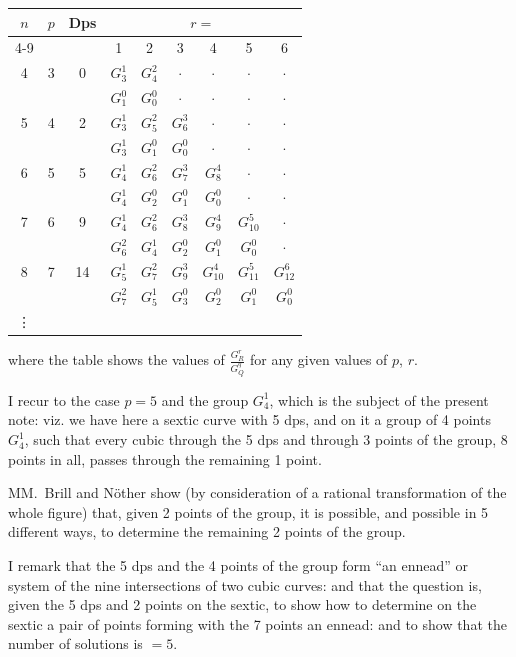 \documentclass[11pt,a4paper]{book}
\begin{document}
\begin{center}
\begin{tabular}{|c|c|c|cccccc|}
\hline
$n$ & $p$ & Dps & \multicolumn{6}{c|}{$r = $}\\
\cline{4-9}
& & & 1 & 2 & 3 & 4 & 5 & 6\\
\hline
4 & 3 & 0 & $G_3^1$ & $G_4^2$ & $\cdot$ & $\cdot$ & $\cdot$ & $\cdot$\\
& & & $G_1^0$ & $G_0^0$ & $\cdot$ & $\cdot$ & $\cdot$ & $\cdot$\\
\hline
5 & 4 & 2 & $G_3^1$ & $G_5^2$ & $G_6^3$ & $\cdot$ & $\cdot$ & $\cdot$\\
& & & $G_3^1$ & $G_1^0$ & $G_0^0$ & $\cdot$ & $\cdot$ & $\cdot$\\
\hline
6 & 5 & 5 & $G_4^1$ & $G_6^2$ & $G_7^3$ & $G_8^4$ & $\cdot$ & $\cdot$\\
& & & $G_4^1$ & $G_2^0$ & $G_1^0$ & $G_0^0$ & $\cdot$ & $\cdot$\\
\hline
7 & 6 & 9 & $G_4^1$ & $G_6^2$ & $G_8^3$ & $G_9^4$ & $G_{10}^5$ & $\cdot$\\
& & & $G_6^2$ & $G_4^1$ & $G_2^0$ & $G_1^0$ & $G_0^0$ & $\cdot$\\
\hline
8 & 7 & 14 & $G_5^1$ & $G_7^2$ & $G_9^3$ & $G_{10}^4$ & $G_{11}^5$ & $G_{12}^6$\\
& & & $G_7^2$ & $G_5^1$ & $G_3^0$ & $G_2^0$ & $G_1^0$ & $G_0^0$\\
\hline
\vdots & & & & & & & &\\
\hline
\end{tabular}
\end{center}

where the table shows the values of $\displaystyle\frac{G_R^r}{G_Q^q}$ for any given values of $p$, $r$.

I recur to the case $p = 5$ and the group $G_4^1$, which is the subject of the present note: viz. we have here a sextic curve with 5 dps, and on it a group of 4 points $G_4^1$, such that every cubic through the 5 dps and through 3 points of the group, 8 points in all, passes through the remaining 1 point.

MM.~Brill and N\"{o}ther show (by consideration of a rational transformation of the whole figure) that, given 2 points of the group, it is possible, and possible in 5 different ways, to determine the remaining 2 points of the group.

I remark that the 5 dps and the 4 points of the group form ``an ennead'' or system of the nine intersections of two cubic curves: and that the question is, given the 5 dps and 2 points on the sextic, to show how to determine on the sextic a pair of points forming with the 7 points an ennead: and to show that the number of solutions is $= 5$.
\end{document}
